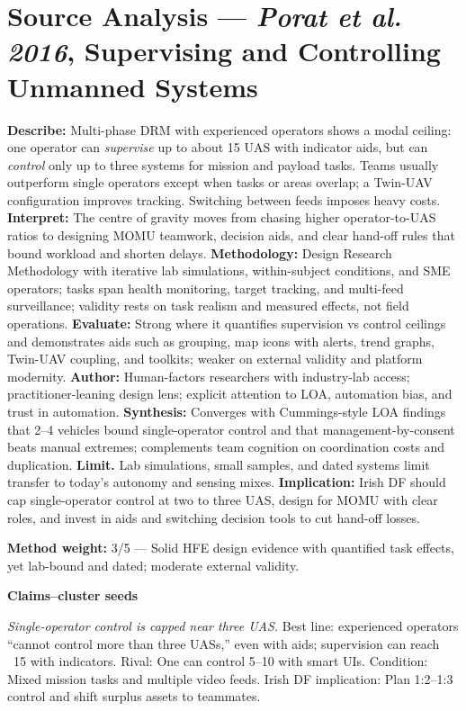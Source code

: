 \section*{Source Analysis — \textit{Porat et al. 2016}, Supervising and Controlling Unmanned Systems}
\textbf{Describe:} Multi-phase DRM with experienced operators shows a modal ceiling: one operator can \textit{supervise} up to about 15 UAS with indicator aids, but can \textit{control} only up to three systems for mission and payload tasks. Teams usually outperform single operators except when tasks or areas overlap; a Twin-UAV configuration improves tracking. Switching between feeds imposes heavy costs.
\textbf{Interpret:} The centre of gravity moves from chasing higher operator-to-UAS ratios to designing MOMU teamwork, decision aids, and clear hand-off rules that bound workload and shorten delays.
\textbf{Methodology:} Design Research Methodology with iterative lab simulations, within-subject conditions, and SME operators; tasks span health monitoring, target tracking, and multi-feed surveillance; validity rests on task realism and measured effects, not field operations.
\textbf{Evaluate:} Strong where it quantifies supervision vs control ceilings and demonstrates aids such as grouping, map icons with alerts, trend graphs, Twin-UAV coupling, and toolkits; weaker on external validity and platform modernity.
\textbf{Author:} Human-factors researchers with industry-lab access; practitioner-leaning design lens; explicit attention to LOA, automation bias, and trust in automation.
\textbf{Synthesis:} Converges with Cummings-style LOA findings that 2–4 vehicles bound single-operator control and that management-by-consent beats manual extremes; complements team cognition on coordination costs and duplication.
\textbf{Limit.} Lab simulations, small samples, and dated systems limit transfer to today’s autonomy and sensing mixes.
\textbf{Implication:} Irish DF should cap single-operator control at two to three UAS, design for MOMU with clear roles, and invest in aids and switching decision tools to cut hand-off losses.

\textbf{Method weight:} 3/5 — Solid HFE design evidence with quantified task effects, yet lab-bound and dated; moderate external validity.

\textbf{Claims–cluster seeds}

\textit{Single-operator control is capped near three UAS.} Best line: experienced operators “cannot control more than three UASs,” even with aids; supervision can reach ~15 with indicators. Rival: One can control 5–10 with smart UIs. Condition: Mixed mission tasks and multiple video feeds. Irish DF implication: Plan 1:2–1:3 control and shift surplus assets to teammates.

